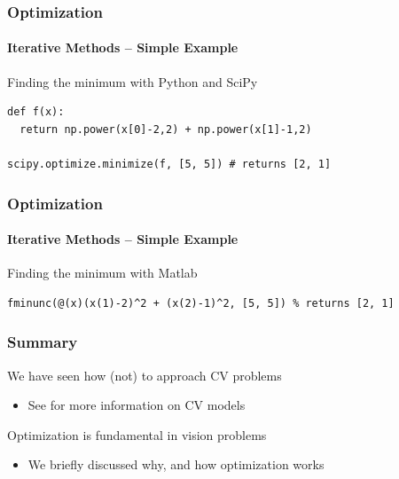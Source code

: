 \documentclass[xetex,professionalfont]{beamer}
\begin{document}
\begin{frame}[fragile]
\frametitle{Optimization}
\framesubtitle{Iterative Methods -- Simple Example}

Finding the minimum with Python and SciPy %

\bigskip
\begin{verbatim}
def f(x):
  return np.power(x[0]-2,2) + np.power(x[1]-1,2)

scipy.optimize.minimize(f, [5, 5]) # returns [2, 1]
\end{verbatim}

\end{frame}


\begin{frame}[fragile]
\frametitle{Optimization}
\framesubtitle{Iterative Methods -- Simple Example}

Finding the minimum with Matlab %

\bigskip
\begin{verbatim}
fminunc(@(x)(x(1)-2)^2 + (x(2)-1)^2, [5, 5]) % returns [2, 1]
\end{verbatim}

\end{frame}


\begin{frame}
\frametitle{Summary}

We have seen how (not) to approach CV problems
\begin{itemize}
    \item See \cite{prince12} for more information on CV models
\end{itemize}

\bigskip
Optimization is fundamental in vision problems
\begin{itemize}
    \item We briefly discussed why, and how optimization works
\end{itemize}

\end{frame}

\end{document}
